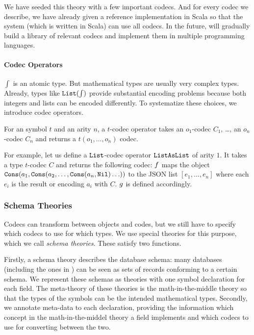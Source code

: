 We have seeded this theory with a few important codecs.
And for every codec we describe, we have already given a reference implementation in Scala so that the \MMT system (which is written in Scala) can use all codecs.
In the future, \pn will gradually build a library of relevant codecs and implement them in multiple programming languages.

\paragraph{Codec Operators}
$\int$ is an atomic type.
But mathematical types are usually very complex types.
Already, types like $\texttt{List}(\int)$ provide substantial encoding problems because both integers and lists can be encoded differently.
To systematize these choices, we introduce codec operators.

\begin{mydef}
  For an \MMT symbol $t$ and an arity $n$, a $t$-codec operator takes an $o_1$-codec $C_1$, \ldots, an $o_n$-codec $C_n$ and returns a $t(o_1,\ldots,o_n)$ codec.
\end{mydef}

For example, let us define a $\texttt{List}$-codec operator $\texttt{ListAsList}$ of arity $1$.
It takes a type $t$-codec $C$ and returns the following codec: $f$ maps the object $\texttt{Cons}(a_1,\texttt{Cons}(a_2,\ldots,\texttt{Cons}(a_n,\texttt{Nil})\ldots))$ to the JSON list $[e_1,\ldots,e_n]$ where each $e_i$ is the result or encoding $a_i$ with $C$.
$g$ is defined accordingly.

\subsubsection{Schema Theories}


Codecs can transform between \MMT objects and codes, but we still have to specify which codecs to use for which types.
We use special theories for this purpose, which we call \emph{schema theories}.
These satisfy two functions.

Firstly, a schema theory describes the database schema: many databases (including the ones in \LMFDB) can be seen as sets of records conforming to a certain schema.
We represent these schemas as \MMT theories with one symbol declaration for each field.
The meta-theory of these theories is the math-in-the-middle theory  so that the types of the symbols can be the intended mathematical types.
Secondly, we annotate meta-data to each declaration, providing the information which concept in the math-in-the-middel theory a field implements and which codecs to use for converting between the two.

